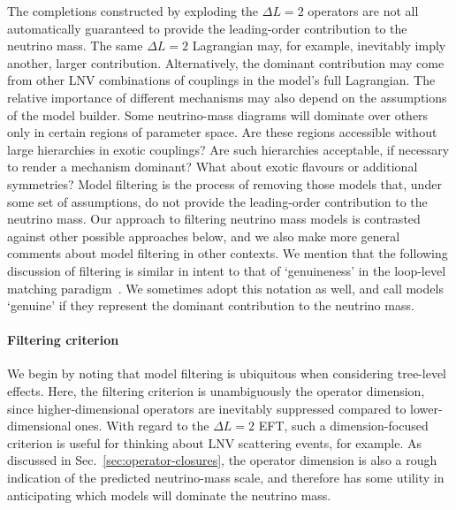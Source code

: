 The completions constructed by exploding the $\Delta L = 2$ operators are not
all automatically guaranteed to provide the leading-order contribution to the
neutrino mass. The same $\Delta L = 2$ Lagrangian may, for example, inevitably
imply another, larger contribution. Alternatively, the dominant contribution may
come from other LNV combinations of couplings in the model's full Lagrangian.
The relative importance of different mechanisms may also depend on the
assumptions of the model builder. Some neutrino-mass diagrams will dominate over
others only in certain regions of parameter space. Are these regions accessible
without large hierarchies in exotic couplings? Are such hierarchies acceptable,
if necessary to render a mechanism dominant? What about exotic flavours or
additional symmetries? Model filtering is the process of removing those models
that, under some set of assumptions, do not provide the leading-order
contribution to the neutrino mass. Our approach to filtering neutrino mass
models is contrasted against other possible approaches below, and we also make
more general comments about model filtering in other contexts. We mention that
the following discussion of filtering is similar in intent to that of
`genuineness' in the loop-level matching paradigm~\cite{Bonnet:2012kz,
  Sierra:2014rxa, Cepedello:2018rfh, Farzan:2012ev}. We sometimes adopt this
notation as well, and call models `genuine' if they represent the dominant
contribution to the neutrino mass.

\paragraph{Filtering criterion} We begin by noting that model filtering is
ubiquitous when considering tree-level effects. Here, the filtering criterion is
unambiguously the operator dimension, since higher-dimensional operators are
inevitably suppressed compared to lower-dimensional ones. With regard to the
$\Delta L = 2$ EFT, such a dimension-focused criterion is useful for thinking
about LNV scattering events, for example. As discussed in
Sec.~\ref{sec:operator-closures}, the operator dimension is also a rough
indication of the predicted neutrino-mass scale, and therefore has some utility
in anticipating which models will dominate the neutrino mass.

